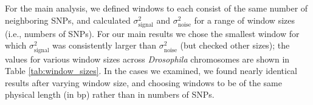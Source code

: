 \documentclass[11pt, oneside]{article}   	%
\begin{document}
For the main analysis, we defined windows to each consist of the same number of neighboring SNPs,
and calculated $\sigma^2_\text{signal}$ and $\sigma^2_\text{noise}$
for a range of window sizes (i.e., numbers of SNPs).
For our main results we
chose the smallest window for which $\sigma^2_\text{signal}$ was consistently larger than $\sigma^2_\text{noise}$ (but checked other sizes);
the values for various window sizes across \textit{Drosophila} chromosomes are shown in Table \ref{tab:window_sizes}.
In the cases we examined, we found nearly identical results after varying window size,
and choosing windows to be of the same physical length (in bp) rather than in numbers of SNPs.

\end{document}

